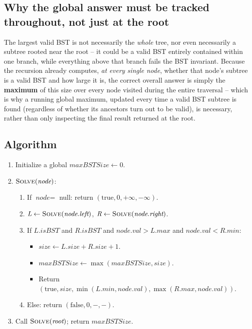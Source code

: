 \subsection*{Why the global answer must be tracked throughout, not just at the root}

The largest valid BST is not necessarily the \emph{whole} tree, nor even
necessarily a subtree rooted near the root -- it could be a valid BST
entirely contained within one branch, while everything above that branch
fails the BST invariant. Because the recursion already computes,
\emph{at every single node}, whether that node's subtree is a valid BST
and how large it is, the correct overall answer is simply the
\textbf{maximum} of this size over every node visited during the entire
traversal -- which is why a running global maximum, updated every time a
valid BST subtree is found (regardless of whether its ancestors turn out
to be valid), is necessary, rather than only inspecting the final result
returned at the root.

\subsection*{Algorithm}

\begin{enumerate}
  \item Initialize a global $\textit{maxBSTSize} \gets 0$.
  \item $\textsc{Solve}(\textit{node})$:
  \begin{enumerate}
    \item If $\textit{node} = $ null: return $(\text{true}, 0, +\infty,
          -\infty)$.
    \item $\textit{L} \gets \textsc{Solve}(\textit{node}.\textit{left})$,
          $\textit{R} \gets
          \textsc{Solve}(\textit{node}.\textit{right})$.
    \item If $\textit{L}.\textit{isBST}$ and $\textit{R}.\textit{isBST}$
          and $\textit{node}.\textit{val} > \textit{L}.\textit{max}$ and
          $\textit{node}.\textit{val} < \textit{R}.\textit{min}$:
    \begin{itemize}
      \item $\textit{size} \gets \textit{L}.\textit{size} +
            \textit{R}.\textit{size} + 1$.
      \item $\textit{maxBSTSize} \gets \max(\textit{maxBSTSize},
            \textit{size})$.
      \item Return $(\text{true}, \textit{size},
            \min(\textit{L}.\textit{min}, \textit{node}.\textit{val}),
            \max(\textit{R}.\textit{max}, \textit{node}.\textit{val}))$.
    \end{itemize}
    \item Else: return $(\text{false}, 0, -, -)$.
  \end{enumerate}
  \item Call $\textsc{Solve}(\textit{root})$; return
        $\textit{maxBSTSize}$.
\end{enumerate}

